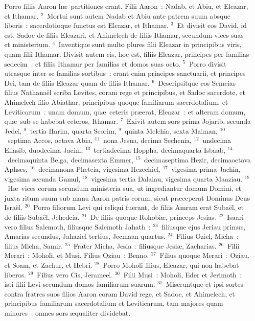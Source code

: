 \lettrine[lines=3,image=true,loversize=0.05,lraise=-0.03]{P}{}orro filiis Aaron h\ae\ partitiones erant. Filii Aaron~: Nadab, et Abiu, et Eleazar, et Ithamar.
${}^{2}$~Mortui sunt autem Nadab et Abiu ante patrem suum absque liberis~: sacerdotioque functus est Eleazar, et Ithamar.
${}^{3}$~Et divisit eos David, id est, Sadoc de filiis Eleazari, et Ahimelech de filiis Ithamar, secundum vices suas et ministerium.
${}^{4}$~Inventique sunt multo plures filii Eleazar in principibus viris, quam filii Ithamar. Divisit autem eis, hoc est, filiis Eleazar, principes per familias sedecim~: et filiis Ithamar per familias et domos suas octo.
${}^{5}$~Porro divisit utrasque inter se familias sortibus~: erant enim principes sanctuarii, et principes Dei, tam de filiis Eleazar quam de filiis Ithamar.
${}^{6}$~Descripsitque eos Semeias filius Nathana\"el scriba Levites, coram rege et principibus, et Sadoc sacerdote, et Ahimelech filio Abiathar, principibus quoque familiarum sacerdotalium, et Leviticarum~: unam domum, qu\ae\ ceteris pr\ae erat, Eleazar~: et alteram domum, qu\ae\ sub se habebat ceteros, Ithamar.
${}^{7}$~Exivit autem sors prima Jojarib, secunda Jedei,
${}^{8}$~tertia Harim, quarta Seorim,
${}^{9}$~quinta Melchia, sexta Maiman,
${}^{10}$~septima Accos, octava Abia,
${}^{11}$~nona Jesua, decima Sechenia,
${}^{12}$~undecima Eliasib, duodecima Jacim,
${}^{13}$~tertiadecima Hoppha, decimaquarta Isbaab,
${}^{14}$~decimaquinta Belga, decimasexta Emmer,
${}^{15}$~decimaseptima Hezir, decimaoctava Aphses,
${}^{16}$~decimanona Pheteia, vigesima Hezechiel,
${}^{17}$~vigesima prima Jachin, vigesima secunda Gamul,
${}^{18}$~vigesima tertia Dalaiau, vigesima quarta Maaziau.
${}^{19}$~H\ae\ vices eorum secundum ministeria sua, ut ingrediantur domum Domini, et juxta ritum suum sub manu Aaron patris eorum, sicut pr\ae ceperat Dominus Deus Isra\"el.
${}^{20}$~Porro filiorum Levi qui reliqui fuerant, de filiis Amram erat Suba\"el, et de filiis Suba\"el, Jehedeia.
${}^{21}$~De filiis quoque Rohobi\ae , princeps Jesias.
${}^{22}$~Isaari vero filius Salemoth, filiusque Salemoth Jahath~:
${}^{23}$~filiusque ejus Jeriau primus, Amarias secundus, Jahaziel tertius, Jecmaan quartus.
${}^{24}$~Filius Oziel, Micha~: filius Micha, Samir.
${}^{25}$~Frater Micha, Jesia~: filiusque Jesi\ae , Zacharias.
${}^{26}$~Filii Merari~: Moholi, et Musi. Filius Oziau~: Benno.
${}^{27}$~Filius quoque Merari~: Oziau, et Soam, et Zachur, et Hebri.
${}^{28}$~Porro Moholi filius, Eleazar, qui non habebat liberos.
${}^{29}$~Filius vero Cis, Jerameel.
${}^{30}$~Filii Musi~: Moholi, Eder et Jerimoth~: isti filii Levi secundum domos familiarum suarum.
${}^{31}$~Miseruntque et ipsi sortes contra fratres suos filios Aaron coram David rege, et Sadoc, et Ahimelech, et principibus familiarum sacerdotalium et Leviticarum, tam majores quam minores~: omnes sors \ae qualiter dividebat.

